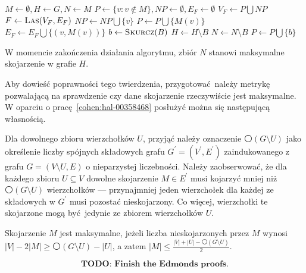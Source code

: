 {\begin{algorithm}
\begin{algorithmic}[1]
        \State $M \gets \emptyset, H \gets G, N \gets M$
        \State $P \gets \{v: v \notin M\}, NP \gets \emptyset, E_F \gets \emptyset$\label{init_edmonds}
        \State $V_F \gets P \bigcup NP$
        \State $F \gets \Call{Las}{V_F, E_F}$
        \label{pick_edge}
        \EndIf
          \State $NP \gets NP \bigcup \{v\}$
          \State $P \gets P \bigcup \{M(v)\}$
          \State $E_F \gets E_F \bigcup \{(v, M(v))\}$
          \State $b \gets \Call{Skurcz}{B}$
          \State $H \gets H\setminus B$
          \State $N \gets N\setminus B$
          \State $P \gets P \bigcup \{b\}$
        \EndIf
      \EndFunction
    \end{algorithmic}
  \end{algorithm}
  \begin{theorem}
    W momencie zakończenia działania algorytmu, zbiór $N$ stanowi maksymalne skojarzenie w grafie $H$.
  \end{theorem}
  Aby dowieść poprawności tego twierdzenia, przygotować należy metrykę pozwalającą na sprawdzenie czy dane skojarzenie rzeczywiście jest maksymalne.
  W oparciu o pracę~\ref{cohen:hal-00358468} posłużyć można się następującą własnością.

  Dla dowolnego zbioru wierzchołków $U$, przyjąć należy oznaczenie $\mdwhtcircle (G \setminus U)$ jako określenie liczby spójnych składowych grafu $G^\prime=(V^\prime, E^\prime)$ zaindukowanego z grafu $G=(V \setminus U, E)$ o nieparzystej liczebności.
  Należy zaobserwować, że dla każdego zbioru $U \subseteq V$ dowolne skojarzenie $M \in E^\prime$ musi kojarzyć mniej niż $\mdwhtcircle (G \setminus U)$ wierzchołków --- przynajmniej jeden wierzchołek dla każdej ze składowych w $G^\prime$ musi pozostać nieskojarzony.
  Co więcej, wierzchołki te skojarzone mogą być jedynie ze zbiorem wierzchołków $U$.
  \begin{definition}
    Skojarzenie $M$ jest maksymalne, jeżeli liczba nieskojarzonych przez $M$ wynosi $|V| - 2|M| \geq \mdwhtcircle (G \setminus U) - |U|$, a zatem $|M|\leq \frac{|V|+|U| - \mdwhtcircle (G \setminus U)}{2}$.
  \end{definition}
  \[
    \textbf{TODO: Finish the Edmonds proofs.}
  \]
}